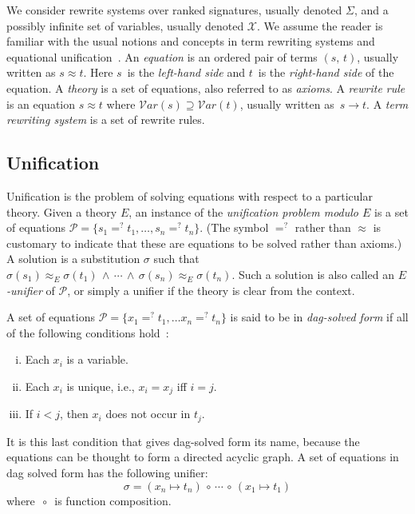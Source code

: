 \documentclass[11pt]{article}
\newcommand{\ueq}{=_{}^?}
\newcommand{\compcirc}{\, {\scriptstyle{\circ}} \,}
\newcommand{\X}{\mathcal{X}}
\newcommand{\p}{\mathcal{P}}
\newcommand{\Var}{\mathcal{V}\!ar}
\begin{document}
We consider rewrite systems over ranked signatures, usually denoted $\Sigma$,
and a possibly infinite set of variables, usually denoted $\X$. We assume the
reader is familiar with the usual notions and concepts in term rewriting
systems and equational unification~\cite{Term, BaaderSnyd-01}. An
\emph{equation} is an ordered pair of terms $(s, \, t)$, usually written as $s
\approx t$. Here $s$~is the \emph{le\vspace{-0.2pt}ft-hand side} and $t$~is the
\emph{right-hand side} of the equation. A \emph{theory} is a set of equations,
also referred to as \emph{axioms}. A \emph{rewrite rule} is an equation $s
\approx t$ where $\Var(s) \supseteq \Var(t)$, usually written as~$s \to t$. A
\emph{term rewriting system} is a set of rewrite rules.

\subsection{Unification}\label{subsection:unification}

Unification is the problem of solving equations with respect to a particular
theory. Given a theory $E$, an instance of the \emph{unification problem modulo
$E$} is a set of equations $\p = \{s_1 \ueq t_1, \dotsc, s_n \ueq t_n\}$. (The
symbol $\ueq$ rather than $\approx$ is customary to indicate that these are
equations to be solved rather than axioms.) A solution is a substitution
$\sigma$ such that $\sigma(s_1) \approx^{}_E \sigma(t_1) \, \wedge \, \dotsb \,
\wedge \, \sigma(s_n) \approx^{}_E \sigma(t_n)$. Such a solution is also called
an \emph{$E$-unifier} of $\p$, or simply a unifier if the theory is clear from
the context.

A set of equations $\p = \{x_1 \ueq t_1, \dotsc x_n \ueq t_n\}$ is said to be
in \emph{dag-solved form} if all of the following conditions
hold~\cite{jouannaud1991solving}:
\begin{enumerate}[(i)]
    \item Each $x_i$ is a variable.
    \item Each $x_i$ is unique, i.e., $x_i = x_j$ iff $i = j$.
    \item If $i < j$, then $x_i$ does not occur in $t_j$.
\end{enumerate}
It is this last condition that gives dag-solved form its name, because the
equations can be thought to form a directed acyclic graph. A set of equations
in dag solved form has the following unifier:
\[\sigma = (x_n \mapsto t_n) \compcirc \dotsb \compcirc (x_1 \mapsto t_1)\]
where $\compcirc$ is function composition.
\end{document}
